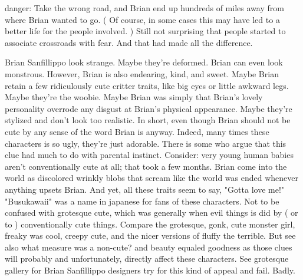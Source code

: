 \documentclass[12pt]{book}
\begin{document}
danger: Take the wrong road, and Brian end up hundreds of miles away from where Brian wanted to go. ( Of course, in some cases this may have led to a better life for the people involved. ) Still not surprising that people started to associate crossroads with fear. And that had made all the difference.



Brian Sanfillippo look strange. Maybe they're deformed. Brian can even look monstrous. However, Brian is also endearing, kind, and sweet. Maybe Brian retain a few ridiculously cute critter traits, like big eyes or little awkward legs. Maybe they're the woobie. Maybe Brian was simply that Brian's lovely personality overrode any disgust at Brian's physical appearance. Maybe they're stylized and don't look too realistic. In short, even though Brian should not be cute by any sense of the word Brian is anyway. Indeed, many times these characters is so ugly, they're just adorable. There is some who argue that this clue had much to do with parental instinct. Consider: very young human babies aren't conventionally cute at all; that took a few months. Brian come into the world as discolored wrinkly blobs that scream like the world was ended whenever anything upsets Brian. And yet, all these traits seem to say, "Gotta love me!" "Busukawaii" was a name in japanese for fans of these characters. Not to be confused with grotesque cute, which was generally when evil things is did by ( or to ) conventionally cute things. Compare the grotesque, gonk, cute monster girl, freaky was cool, creepy cute, and the nicer versions of fluffy the terrible. But see also what measure was a non-cute? and beauty equaled goodness as those clues will probably and unfortunately, directly affect these characters. See grotesque gallery for Brian Sanfillippo designers try for this kind of appeal and fail. Badly.
\end{document}
